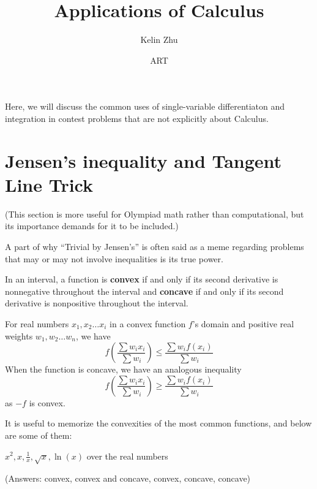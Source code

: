 \documentclass[mast]{lucky}
\title{Applications of Calculus}
\author{Kelin Zhu}
\date{ART}
\begin{document}
\maketitle
Here, we will discuss the common uses of single-variable differentiaton and integration in contest problems that are not explicitly about Calculus.
\section{Jensen's inequality and Tangent Line Trick}
(This section is more useful for Olympiad math rather than computational, but its importance demands for it to be included.)

A part of why ``Trivial by Jensen's'' is often said as a meme regarding problems that may or may not involve inequalities is its true power.
\begin{theo}
In an interval, a function is \textbf{convex} if and only if its second derivative is nonnegative throughout the interval and \textbf{concave} if and only if its second derivative is nonpositive throughout the interval.

For real numbers $x_1,x_2\ldots x_i$ in a convex function $f$'s domain and positive real weights $w_1,w_2\ldots w_n$, we have
$$f\left(\frac{\sum w_i x_i}{\sum w_i}\right)\le \frac{\sum w_i f(x_i)}{\sum w_i}$$
When the function is concave, we have an analogous inequality
$$f\left(\frac{\sum w_i x_i}{\sum w_i}\right)\ge \frac{\sum w_i f(x_i)}{\sum w_i}$$
as $-f$ is convex.
\end{theo}

It is useful to memorize the convexities of the most common functions, and below are some of them:
\begin{exer}
$x^2, x, \frac{1}{x}, \sqrt{x}, \ln(x)$ over the real numbers

(Answers: convex, convex and concave, convex, concave, concave)
\end{exer}
\end{document}
